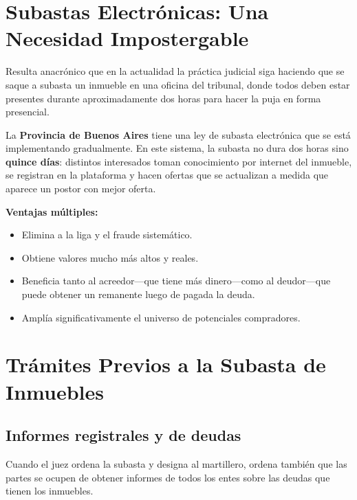 \documentclass[12pt,oneside]{book}
\begin{document}
\section{Subastas Electrónicas: Una Necesidad Impostergable}

Resulta anacrónico que en la actualidad la práctica judicial siga haciendo que se saque a subasta un inmueble en una oficina del tribunal, donde todos deben estar presentes durante aproximadamente dos horas para hacer la puja en forma presencial.

La \textbf{Provincia de Buenos Aires} tiene una ley de subasta electrónica que se está implementando gradualmente. En este sistema, la subasta no dura dos horas sino \textbf{quince días}: distintos interesados toman conocimiento por internet del inmueble, se registran en la plataforma y hacen ofertas que se actualizan a medida que aparece un postor con mejor oferta.

\textbf{Ventajas múltiples:}

\begin{itemize}
    \item Elimina a la liga y el fraude sistemático.
    \item Obtiene valores mucho más altos y reales.
    \item Beneficia tanto al acreedor---que tiene más dinero---como al deudor---que puede obtener un remanente luego de pagada la deuda.
    \item Amplía significativamente el universo de potenciales compradores.
\end{itemize}

\section{Trámites Previos a la Subasta de Inmuebles}

\subsection{Informes registrales y de deudas}

Cuando el juez ordena la subasta y designa al martillero, ordena también que las partes se ocupen de obtener informes de todos los entes sobre las deudas que tienen los inmuebles.
\end{document}
